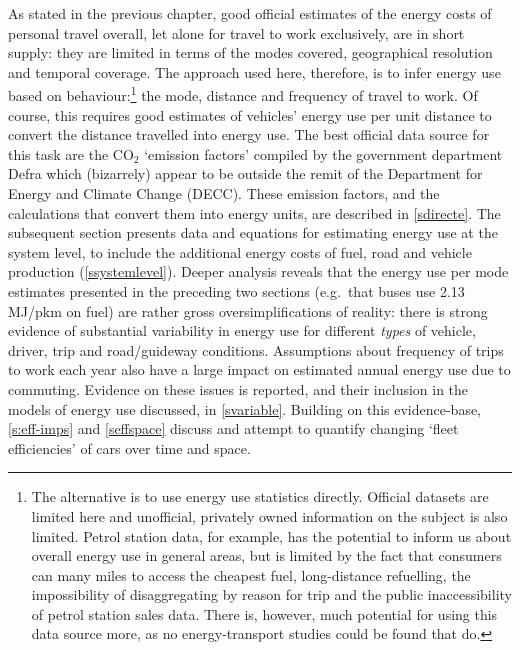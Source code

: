 As stated in the previous chapter, good official estimates of the energy costs of personal
travel overall, let alone for travel to work exclusively, are in short supply:
they are limited in terms of the modes covered, geographical resolution and
temporal coverage.
The approach used here, therefore, is to infer
energy use based on
behaviour:\footnote{The
alternative is to use energy use statistics directly.
Official datasets are limited here and unofficial, privately owned
information on the subject is also limited. Petrol
station data, for example,
has the potential to inform us about overall energy use in
general areas, but is limited by the fact that consumers can many miles to
access the cheapest fuel, long-distance refuelling, the impossibility
of disaggregating by reason for trip and the public inaccessibility of petrol
station sales data. There is, however, much potential for using this data
source more, as no energy-transport studies could be found that do.
}
the mode, distance and frequency of
travel to work. Of course, this requires good estimates of vehicles' energy use
per unit distance to convert the distance travelled into energy use. The best
official data source for this task are the CO$_2$ `emission factors'
compiled by the government department Defra which (bizarrely) appear
to be outside the remit of
the Department for Energy and Climate Change (DECC).
These emission factors, and the calculations that convert them into
energy units, are described in \cref{sdirecte}. The subsequent section presents
data and equations for estimating energy use at the system level, to include
the additional energy costs of fuel, road and vehicle production
(\cref{ssystemlevel}). Deeper analysis reveals that the energy use per mode
estimates presented in the preceding two sections
(e.g.~that buses use 2.13 MJ/pkm on fuel) are rather gross oversimplifications
of reality: there is strong evidence of substantial variability in energy use
for different \emph{types} of vehicle, driver, trip and road/guideway
conditions. Assumptions about frequency of trips to work each year also
have a large impact on estimated annual energy use due to commuting.
Evidence on these issues is reported, and their inclusion in the models
of energy use discussed, in \cref{svariable}. Building on this evidence-base,
\cref{s:eff-imps} and \cref{seffspace} discuss and attempt to quantify
changing `fleet efficiencies' of cars over time and space. %

